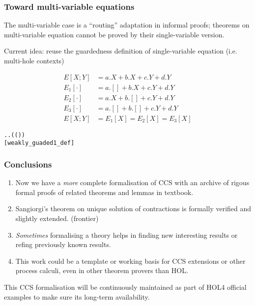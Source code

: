 \begin{frame}
\frametitle{Toward multi-variable equations}
\begin{small}
The multi-variable case is a ``routing'' adaptation in informal
proofs; theorems on multi-variable equation cannot be proved
by their single-variable version.

Current idea: reuse the guardedness definition of single-variable equation
(i.e. multi-hole contexts)
\begin{examples}
\vspace{-3ex}
\begin{align*}
E[X; Y] &= a.X + b.X + c.Y + d.Y \\
E_1[\cdot] &= a.[] + b.X + c.Y + d.Y \\
E_2[\cdot] &= a.X + b.[] + c.Y + d.Y \\
E_3[\cdot] &= a.[] + b.[] + c.Y + d.Y \\
E[X; Y] &= E_1[X] = E_2[X] = E_3[X]
\end{align*}
\end{examples}
\begin{definition}
\begin{alltt}
  \HOLSymConst{\HOLTokenEquiv{}}
\HOLSymConst{\HOLTokenForall{}}.  \HOLSymConst{\HOLTokenIn{}}   \HOLSymConst{\HOLTokenImp{}} \HOLSymConst{\HOLTokenForall{}}.   \HOLSymConst{\HOLTokenConj{}} ( ( ) \HOLSymConst{=} ) \HOLSymConst{\HOLTokenImp{}}  
\hfill{[weakly_guaded1_def]}
\end{alltt}
\end{definition}
\end{small}
\end{frame}

%

\begin{frame}
\frametitle{Conclusions}
\begin{enumerate}
\item Now we have a \emph{more} complete formalisation of CCS with an
  archive of rigous formal proofs of related theorems and lemmas in textbook.
\item Sangiorgi's theorem on unique solution of contractions is formally verified and
  slightly extended. (frontier)
\item \emph{Sometimes} formalising a theory helps in finding
  new interesting results or refing previously known results.
\item This work could be a template or working basis for CCS extensions or other process calculi, even in other
  theorem provers than HOL.
\end{enumerate}

This CCS formalisation will be continuously maintained as part of HOL4
official examples to make sure its long-term availability.
\end{frame}



